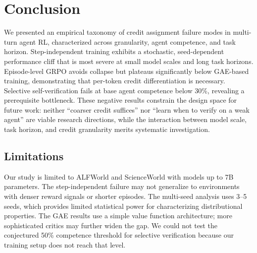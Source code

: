 \documentclass[11pt]{article}
\begin{document}
\section{Conclusion}

We presented an empirical taxonomy of credit assignment failure modes in multi-turn agent RL, characterized across granularity, agent competence, and task horizon.
Step-independent training exhibits a stochastic, seed-dependent performance cliff that is most severe at small model scales and long task horizons.
Episode-level GRPO avoids collapse but plateaus significantly below GAE-based training, demonstrating that per-token credit differentiation is necessary.
Selective self-verification fails at base agent competence below 30\%, revealing a prerequisite bottleneck.
These negative results constrain the design space for future work: neither ``coarser credit suffices'' nor ``learn when to verify on a weak agent'' are viable research directions, while the interaction between model scale, task horizon, and credit granularity merits systematic investigation.

\subsection*{Limitations}

Our study is limited to ALFWorld and ScienceWorld with models up to 7B parameters.
The step-independent failure may not generalize to environments with denser reward signals or shorter episodes.
The multi-seed analysis uses 3--5 seeds, which provides limited statistical power for characterizing distributional properties.
The GAE results use a simple value function architecture; more sophisticated critics may further widen the gap.
We could not test the conjectured 50\% competence threshold for selective verification because our training setup does not reach that level.



\end{document}
